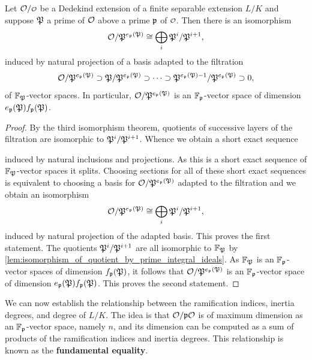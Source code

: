     \begin{lemma}\label{lem:prime_power_vector_space_isomorphism}
      Let \(\mc{O}/\smc{O}\) be a Dedekind extension of a finite separable extension \(L/K\) and suppose \(\mathfrak{P}\) a prime of \(\mathcal{O}\) above a prime \(\mathfrak{p}\) of \(\smc{O}\). Then there is an isomorphism
      \[
        \mathcal{O}/\mathfrak{P}^{e_{\mathfrak{p}}(\mathfrak{P})} \cong \bigoplus_{i}\mathfrak{P}^{i}/\mathfrak{P}^{i+1},
      \]
      induced by natural projection of a basis adapted to the filtration
      \[
        \mathcal{O}/\mathfrak{P}^{e_{\mathfrak{p}}(\mathfrak{P})} \supset \mathfrak{P}/\mathfrak{P}^{e_{\mathfrak{p}}(\mathfrak{P})} \supset \cdots \supset \mathfrak{P}^{e_{\mathfrak{p}}(\mathfrak{P})-1}/\mathfrak{P}^{e_{\mathfrak{p}}(\mathfrak{P})} \supset 0,
      \]
      of \(\mathbb{F}_{\mathfrak{P}}\)-vector spaces. In particular, \(\mathcal{O}/\mathfrak{P}^{e_{\mathfrak{p}}(\mathfrak{P})}\) is an \(\mathbb{F}_{\mathfrak{p}}\)-vector space of dimension \(e_{\mathfrak{p}}(\mathfrak{P})f_{\mathfrak{p}}(\mathfrak{P})\).
    \end{lemma}
    \begin{proof}
      By the third isomorphism theorem, quotients of successive layers of the filtration are isomorphic to \(\mathfrak{P}^{i}/\mathfrak{P}^{i+1}\). Whence we obtain a short exact sequence
      \begin{center}
      \end{center}
      induced by natural inclusions and projections. As this is a short exact sequence of \(\mathbb{F}_{\mathfrak{P}}\)-vector spaces it splits. Choosing sections for all of these short exact sequences is equivalent to choosing a basis for \(\mathcal{O}/\mathfrak{P}^{e_{\mathfrak{p}}(\mathfrak{P})}\) adapted to the filtration and we obtain an isomorphism
      \[
        \mathcal{O}/\mathfrak{P}^{e_{\mathfrak{p}}(\mathfrak{P})} \cong \bigoplus_{i}\mathfrak{P}^{i}/\mathfrak{P}^{i+1},
      \]
      induced by natural projection of the adapted basis. This proves the first statement. The quotients \(\mathfrak{P}^{i}/\mathfrak{P}^{i+1}\) are all isomorphic to \(\mathbb{F}_{\mathfrak{P}}\) by \cref{lem:isomorphism_of_quotient_by_prime_integral_ideals}. As \(\mathbb{F}_{\mathfrak{P}}\) is an \(\mathbb{F}_{\mathfrak{p}}\)-vector spaces of dimension \(f_{\mathfrak{p}}(\mathfrak{P})\), it follows that \(\mathcal{O}/\mathfrak{P}^{e_{\mathfrak{p}}(\mathfrak{P})}\) is an \(\mathbb{F}_{\mathfrak{p}}\)-vector space of dimension \(e_{\mathfrak{p}}(\mathfrak{P})f_{\mathfrak{p}}(\mathfrak{P})\). This proves the second statement.
    \end{proof}
    
     We can now establish the relationship between the ramification indices, inertia degrees, and degree of \(L/K\). The idea is that \(\mathcal{O}/\mathfrak{p}\mathcal{O}\) is of maximum dimension as an \(\mathbb{F}_{\mathfrak{p}}\)-vector space, namely \(n\), and its dimension can be computed as a sum of products of the ramification indices and inertia degrees. This relationship is known as the \textbf{fundamental equality}.

